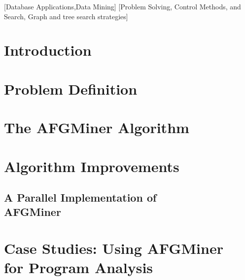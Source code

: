 \documentclass{acm_proc_article-sp}
\begin{document}
[Database Applications,Data Mining]
[Problem Solving, Control Methods, and Search, Graph and tree search strategies]




\section{Introduction}
	\label{sec:intro}
	

\section{Problem Definition}
        \label{sec:ProblemDef}
        
%	

\section{The AFGMiner Algorithm}
	\label{sec:AFGMiner}
	

\section{Algorithm Improvements}
	\label{sec:Improvements}
	
        \subsection{A Parallel Implementation of\\ 
              AFGMiner}
	\label{sec:pAFGMiner}
	
	
\section{Case Studies: Using AFGMiner\\
              for Program Analysis}
	\label{sec:CaseStudies}
	
\end{document}
